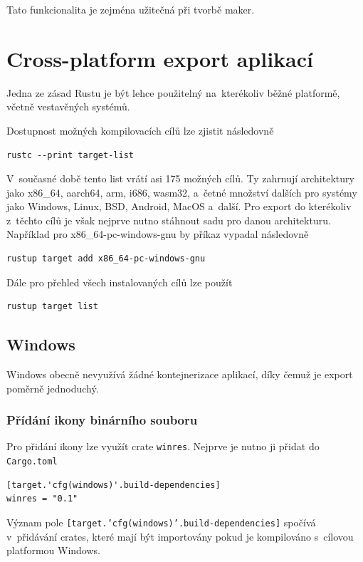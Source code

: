 \documentclass[a4paper, 12pt]{article} %
\begin{document}
            Tato funkcionalita je zejména užitečná při tvorbě maker.


\section{Cross-platform export aplikací}
    Jedna ze zásad Rustu je být lehce použitelný na~kterékoliv běžné platformě, včetně vestavěných systémů.
    
    Dostupnost možných kompilovacích cílů lze zjistit následovně
    \begin{verbatim}
rustc --print target-list
    \end{verbatim}
        
    V~současné době tento list vrátí asi 175 možných cílů. Ty zahrnují architektury jako x86\_64, aarch64, arm, i686, wasm32, a~četné množství dalších pro systémy jako Windows, Linux, BSD, Android, MacOS a~další. Pro export do kterékoliv z~těchto cílů je však nejprve nutno stáhnout sadu pro danou architekturu. Například pro x86\_64-pc-windows-gnu by příkaz vypadal následovně
    \begin{verbatim}
rustup target add x86_64-pc-windows-gnu
    \end{verbatim}
    
    Dále pro přehled všech instalovaných cílů lze použít
    \begin{verbatim}
rustup target list
    \end{verbatim}

    \subsection{Windows}
    Windows obecně nevyužívá žádné kontejnerizace aplikací, díky čemuž je export poměrně jednoduchý.
    
    \subsubsection*{Přídání ikony binárního souboru}
        Pro přidání ikony lze využít crate \texttt{winres}. Nejprve je nutno ji přidat do \texttt{Cargo.toml}
        \begin{verbatim}
[target.'cfg(windows)'.build-dependencies]
winres = "0.1"
        \end{verbatim}
        
        Význam pole \texttt{[target.'cfg(windows)'.build-dependencies]} spočívá v~přidávání crates, které mají být importovány pokud je kompilováno s~cílovou platformou Windows.
        
\end{document}
